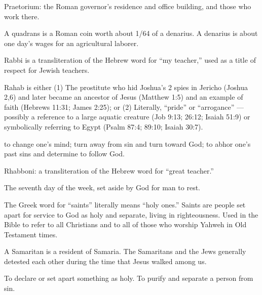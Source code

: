 {\par }{\ILIB Praetorium: the Roman governor’s residence and office building, and those who work there.
\par }{
\par }{\ILIB A quadrans is a Roman coin worth about 1/64 of a denarius. A denarius is about one day’s wages for an agricultural laborer.
\par }{
\par }{\ILIB Rabbi is a transliteration of the Hebrew word for “my teacher,” used as a title of respect for Jewish teachers.
\par }{
\par }{\ILIB Rahab is either (1) The prostitute who hid Joshua’s 2 spies in Jericho (Joshua 2,6) and later became an ancestor of Jesus (Matthew 1:5) and an example of faith (Hebrews 11:31; James 2:25); or (2) Literally, “pride” or “arrogance” — possibly a reference to a large aquatic creature (Job 9:13; 26:12; Isaiah 51:9) or symbolically referring to Egypt (Psalm 87:4; 89:10; Isaiah 30:7).
\par }{
\par }{\ILIB to change one’s mind; turn away from sin and turn toward God; to abhor one’s past sins and determine to follow God.
\par }{
\par }{\ILIB Rhabboni: a transliteration of the Hebrew word for “great teacher.”
\par }{
\par }{\ILIB The seventh day of the week, set aside by God for man to rest.
\par }{
\par }{\ILIB The Greek word for “saints” literally means “holy ones.” Saints are people set apart for service to God as holy and separate, living in righteousness. Used in the Bible to refer to all Christians and to all of those who worship Yahweh in Old Testament times.
\par }{
\par }{\ILIB A Samaritan is a resident of Samaria. The Samaritans and the Jews generally detested each other during the time that Jesus walked among us.
\par }{
\par }{\ILIB To declare or set apart something as holy. To purify and separate a person from sin.
\par }{
}
